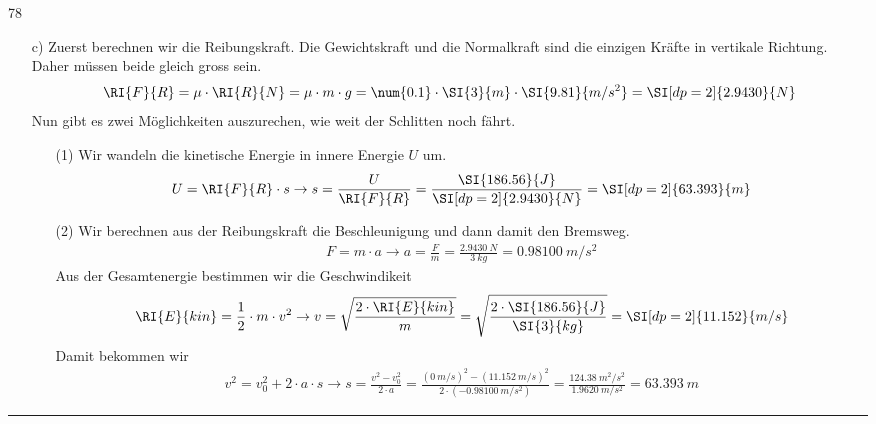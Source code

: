 \documentclass[12pt,a4paper,twoside]{article}
\begin{document}
\begin{ex@loesung}{78}
\begin{itemize}
\item [c)] Zuerst berechnen wir die Reibungskraft. Die Gewichtskraft und die Normalkraft sind die einzigen Kräfte in vertikale Richtung.
Daher müssen beide gleich gross sein.
\begin{eqnarray*}
\RI{F}{R} = \mu\cdot\RI{R}{N} = \mu\cdot m\cdot g =\num{0.1}\cdot\SI{3}{m}\cdot\SI{9.81}{m/s^2}=\SI[dp=2]{2.9430}{N}
\end{eqnarray*}
Nun gibt es zwei Möglichkeiten auszurechen, wie weit der Schlitten noch fährt.
\begin{itemize}
\item [(1)] Wir wandeln die kinetische Energie in innere Energie $U$ um.
\begin{eqnarray*}
U = \RI{F}{R}\cdot s \to s=\frac{U}{\RI{F}{R}}=\frac{\SI{186.56}{J}}{\SI[dp=2]{2.9430}{N}} =\SI[dp=2]{63.393}{m}
\end{eqnarray*}
\item [(2)] Wir berechnen aus der Reibungskraft die Beschleunigung und dann damit den Bremsweg.
\begin{eqnarray*}
F=m\cdot a \to a=\frac{F}{m}=\frac{\SI[dp=2]{2.9430}{N}}{\SI{3}{kg}}=\SI[dp=2]{0.98100}{m/s^2}
\end{eqnarray*}
Aus der Gesamtenergie bestimmen wir die Geschwindikeit
\begin{eqnarray*}
\RI{E}{kin}=\frac{1}{2}\cdot m\cdot v^2 \to v=\sqrt{\frac{2\cdot \RI{E}{kin}}{m}}=\sqrt{\frac{2\cdot\SI{186.56}{J}}{\SI{3}{kg}}}=\SI[dp=2]{11.152}{m/s}
\end{eqnarray*}
Damit bekommen wir
\begin{eqnarray*}
v^2 = v_0^2 +2\cdot a\cdot s \to s=\frac{v^2 -v_0^2}{2\cdot a}=\frac{(\SI{0}{m/s})^2-(\SI[dp=2]{11.152}{m/s})^2}{2\cdot(\SI[dp=2]{-0.98100}{m/s^2})}=\frac{\SI[dp=2]{124.38}{m^2/s^2}}{\SI[dp=2]{1.9620}{m/s^2}}=\SI[dp=2]{63.393}{m}
\end{eqnarray*}
\end{itemize}
\end{itemize}
\hrule \end{ex@loesung}
\end{document}
